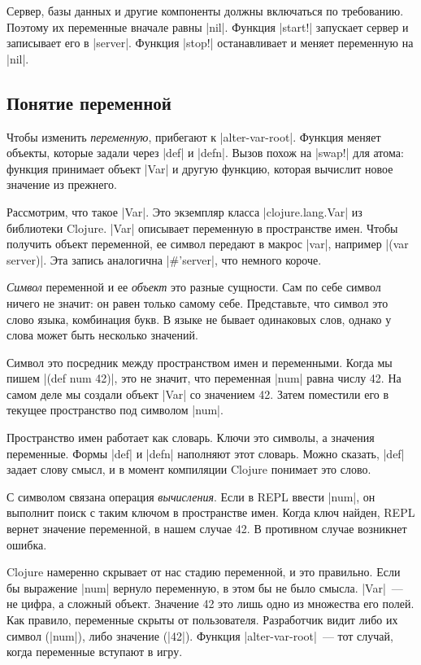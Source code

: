 Сервер, базы данных и другие компоненты должны включаться по требованию. Поэтому
их переменные вначале равны \spverb|nil|. Функция \spverb|start!| запускает
сервер и записывает его в \spverb|server|. Функция \spverb|stop!| останавливает
и меняет переменную на \spverb|nil|.

\subsection{Понятие переменной}

\label{var-section}

Чтобы изменить \emph{переменную}, прибегают к \spverb|alter-var-root|. Функция
меняет объекты, которые задали через \spverb|def| и \spverb|defn|. Вызов похож
на \spverb|swap!| для атома: функция принимает объект \spverb|Var| и другую
функцию, которая вычислит новое значение из прежнего.

Рассмотрим, что такое \spverb|Var|. Это экземпляр класса \spverb|clojure.lang.Var|
из библиотеки Clojure. \spverb|Var| описывает переменную в пространстве имен.
Чтобы получить объект переменной, ее символ передают в макрос \spverb|var|,
например \spverb|(var server)|. Эта запись аналогична \spverb|#'server|,
что немного короче.

\emph{Символ} переменной и ее \emph{объект} это разные сущности. Сам по себе
символ ничего не значит: он равен только самому себе. Представьте, что символ
это слово языка, комбинация букв. В языке не бывает одинаковых слов, однако у
слова может быть несколько значений.

Символ это посредник между пространством имен и переменными. Когда мы пишем
\spverb|(def num 42)|, это не значит, что переменная \spverb|num| равна числу
42. На самом деле мы создали объект \spverb|Var| со значением 42. Затем
поместили его в текущее пространство под символом \spverb|num|.

Пространство имен работает как словарь. Ключи это символы, а значения
переменные. Формы \spverb|def| и \spverb|defn| наполняют этот словарь. Можно
сказать, \spverb|def| задает слову смысл, и в момент компиляции Clojure
понимает это слово.

С символом связана операция \emph{вычисления}. Если в REPL ввести \spverb|num|,
он выполнит поиск с таким ключом в пространстве имен. Когда ключ найден, REPL
вернет значение переменной, в нашем случае 42. В противном случае возникнет
ошибка.

Clojure намеренно скрывает от нас стадию переменной, и это правильно. Если бы
выражение \spverb|num| вернуло переменную, в этом бы не было смысла. \spverb|Var|~---
не цифра, а сложный объект. Значение 42 это лишь одно из множества его полей.
Как правило, переменные скрыты от пользователя. Разработчик видит либо их символ
(\spverb|num|), либо значение (\spverb|42|). Функция \spverb|alter-var-root|~---
тот случай, когда переменные вступают в игру.

